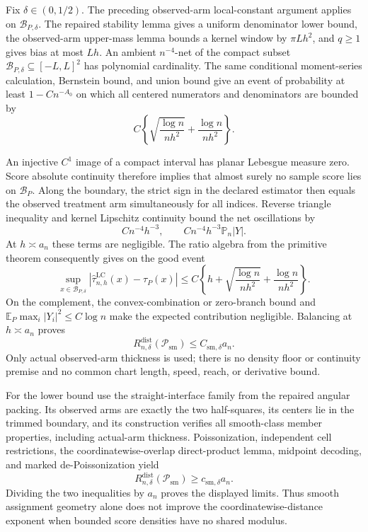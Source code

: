 Fix \(\delta\in(0,1/2)\).  The preceding observed-arm local-constant argument
applies on \(\mathcal B_{P,\delta}\).  The repaired stability lemma gives a
uniform denominator lower bound, the observed-arm upper-mass lemma bounds a
kernel window by \(\pi Lh^2\), and \(q\geq1\) gives bias at most \(Lh\).
An ambient \(n^{-4}\)-net of the compact subset
\(\mathcal B_{P,\delta}\subseteq[-L,L]^2\) has polynomial cardinality.
The same conditional moment-series calculation, Bernstein bound, and union
bound give an event of probability at least \(1-Cn^{-A_0}\) on which all
centered numerators and denominators are bounded by
\[
 C\left\{\sqrt{\frac{\log n}{nh^2}}+
 \frac{\log n}{nh^2}\right\}.
\]

An injective \(C^1\) image of a compact interval has planar Lebesgue measure
zero.  Score absolute continuity therefore implies that almost surely no sample
score lies on \(\mathcal B_P\).  Along the boundary, the strict sign in the
declared estimator then equals the observed treatment arm simultaneously for all
indices.  Reverse triangle inequality and kernel Lipschitz continuity bound the
net oscillations by
\[
 Cn^{-4}h^{-3},
 \qquad Cn^{-4}h^{-3}\mathbb P_n|Y|.
\]
At \(h\asymp a_n\) these terms are negligible.  The ratio algebra from the
primitive theorem consequently gives on the good event
\[
 \sup_{x\in\mathcal B_{P,\delta}}
 |\widehat\tau^{\mathrm{LC}}_{n,h}(x)-\tau_P(x)|
 \leq C\left\{h+\sqrt{\frac{\log n}{nh^2}}+
 \frac{\log n}{nh^2}\right\}.
\]
On the complement, the convex-combination or zero-branch bound and
\(\mathbb E_P\max_i|Y_i|^2\leq C\log n\) make the expected contribution
negligible.  Balancing at \(h\asymp a_n\) proves
\[
 R_{n,\delta}^{\mathrm{dist}}(\mathcal P_{\mathrm{sm}})
 \leq C_{\mathrm{sm},\delta}a_n.
\]
Only actual observed-arm thickness is used; there is no density floor or
continuity premise and no common chart length, speed, reach, or derivative
bound.

For the lower bound use the straight-interface family from the repaired angular
packing.  Its observed arms are exactly the two half-squares, its centers lie in
the trimmed boundary, and its construction verifies all smooth-class member
properties, including actual-arm thickness.  Poissonization, independent cell
restrictions, the coordinatewise-overlap direct-product lemma, midpoint
decoding, and marked de-Poissonization yield
\[
 R_{n,\delta}^{\mathrm{dist}}(\mathcal P_{\mathrm{sm}})
 \geq c_{\mathrm{sm},\delta}a_n.
\]
Dividing the two inequalities by \(a_n\) proves the displayed limits.  Thus
smooth assignment geometry alone does not improve the coordinatewise-distance
exponent when bounded score densities have no shared modulus.